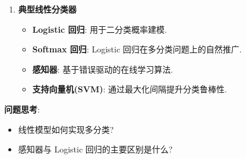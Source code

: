 \documentclass{../nndlcourse}
\begin{document}
\begin{enumerate}
\begin{itemize}
        \begin{itemize}
            \item 在阈值 $t$ 下,
            \begin{equation*}
                \mathrm{TPR}(t) = \mathbb{P}\bigl(s(\boldsymbol{x}) \ge t \mid y = 1\bigr),
                \qquad
                \mathrm{FPR}(t) = \mathbb{P}\bigl(s(\boldsymbol{x}) \ge t \mid y = 0\bigr).
            \end{equation*}
            以 $\mathrm{FPR}$ 为横轴、$\mathrm{TPR}$ 为纵轴即可得到 ROC 曲线.
            \item ROC 曲线越靠近左上角 $(0,1)$, 模型区分能力通常越强; 若曲线接近对角线 $y = x$, 则模型与随机猜测接近.
            \item 若正负样本的打分分布相同, 则对任意阈值都有 $\mathrm{TPR}(t) = \mathrm{FPR}(t)$, 因而 ROC 曲线退化为对角线.
            \item AUC 是 ROC 曲线下的面积,
            \begin{equation*}
                \mathrm{AUC} = \int_0^1 \mathrm{TPR}(u)\, \mathrm{d}u,
                \qquad u = \mathrm{FPR}.
            \end{equation*}
            它衡量模型在所有阈值下的整体排序能力.
            \item 更准确地说, AUC 还可解释为
            \begin{equation*}
                \mathrm{AUC}
                = \mathbb{P}\bigl(s(x^+) > s(x^-)\bigr)
                + \frac{1}{2}\mathbb{P}\bigl(s(x^+) = s(x^-)\bigr),
            \end{equation*}
            即随机抽取一个正样本和一个负样本时, 正样本得分不低于负样本的概率.
        \end{itemize}
    \end{itemize}
    \item \textbf{典型线性分类器}
    \begin{itemize}
        \item \textbf{Logistic 回归}: 用于二分类概率建模.
        \item \textbf{Softmax 回归}: Logistic 回归在多分类问题上的自然推广.
        \item \textbf{感知器}: 基于错误驱动的在线学习算法.
        \item \textbf{支持向量机(SVM)}: 通过最大化间隔提升分类鲁棒性.
    \end{itemize}
\end{enumerate}

\textbf{问题思考}:
\begin{itemize}
    \item 线性模型如何实现多分类?
    \item 感知器与 Logistic 回归的主要区别是什么?
\end{itemize}
\end{document}
